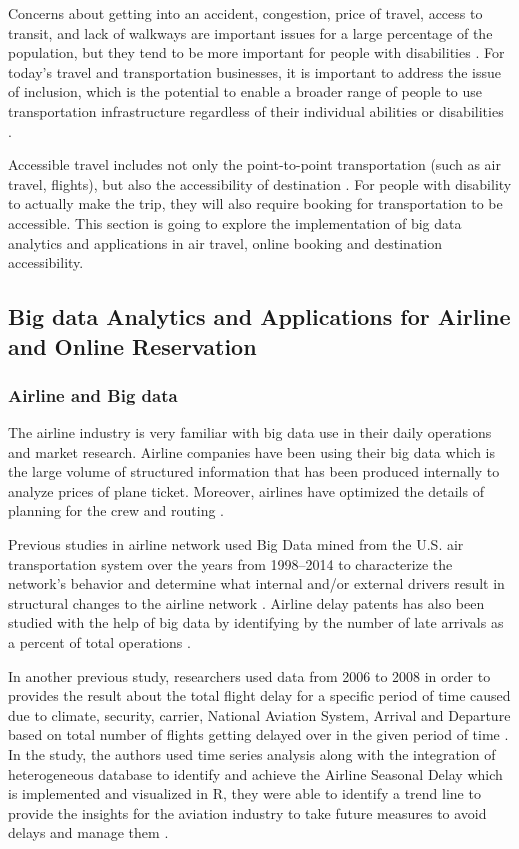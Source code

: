 Concerns about getting into an accident, congestion,
price of travel, access to transit, and lack of walkways are important issues for a large
percentage of the population, but they tend to be more important for people with
disabilities \cite{moya2016dynamic}. For today's travel and transportation businesses,
it is important to address the issue of inclusion, which is the potential to enable 
a broader range of  people to use
transportation infrastructure regardless of their individual abilities or disabilities
\cite{milo}. 

Accessible travel includes not only the point-to-point transportation (such as air
travel, flights), but also the accessibility of destination \cite{Ama,DARCY2010816,milo}.
For people with disability to actually make the trip, they will also require booking for
transportation to be accessible. This section is going to explore the implementation of big
data analytics and applications in air travel, online booking and destination
accessibility. 

\subsection{Big data Analytics and Applications for Airline and Online Reservation}

\subsubsection{Airline and Big data}

The airline industry is very familiar with big data use in their daily operations and market research. Airline companies have been using their big data which is the large volume of structured information that has been produced internally \cite{MIAH2017} to analyze prices of plane ticket. Moreover, airlines have optimized the details of planning for the crew and routing \cite{Shafiee16}. 

Previous studies in airline network used Big Data mined from the U.S. air transportation system over the years from 1998–2014 to characterize the network's behavior and determine what internal and/or external drivers result in structural changes to the airline network \cite{7777957}. Airline delay patents has also been studied with the help of big data by identifying by the number of late arrivals as a percent of total operations \cite{Sor}. 

In another previous study, researchers used data from 2006 to 2008 in order to provides the result about the total flight delay for a specific period of time caused due to climate, security, carrier, National Aviation System, Arrival and Departure based on total number of flights getting delayed over in the given period of time \cite{Sor}. In the study, the authors used time series analysis along with the integration of heterogeneous database to identify and achieve the Airline Seasonal Delay which is implemented and visualized in R, they were able to identify a trend line to provide the insights for the aviation industry to take future measures to avoid delays and manage them \cite{Sor}.

